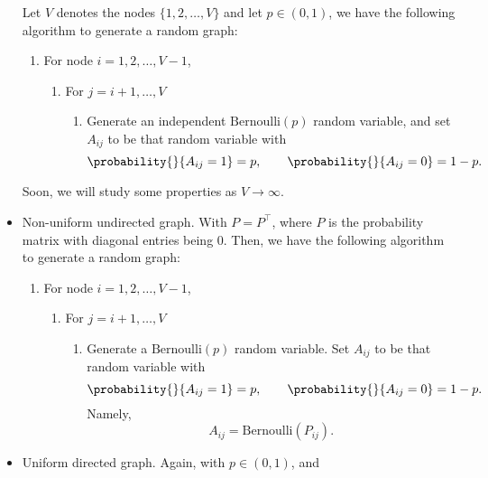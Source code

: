 \begin{itemize}
	      Let \(V\) denotes the nodes \(\{1, 2, \ldots , V\}\) and let \(p\in(0, 1)\), we have the following algorithm to generate a random graph:
	      \begin{enumerate}
		      \item For node \(i = 1, 2, \ldots , V - 1\),
		            \begin{enumerate}
			            \item For \(j = i+1, \ldots , V\)
			                  \begin{enumerate}
				                  \item Generate an independent \(\mathrm{Bernoulli}(p)\) random variable, and set \(A_{ij}\) to be that random variable with
				                        \[
					                        \probability{}{A_{ij} = 1} = p, \qquad \probability{}{A_{ij} = 0} = 1-p  .
				                        \]
			                  \end{enumerate}
		            \end{enumerate}
	      \end{enumerate}
	      Soon, we will study some properties as \(V\to \infty\).
	\item Non-uniform undirected graph. With \(P = P^{\top}\), where \(P\) is the probability matrix with diagonal entries being \(0\). Then, we have the following algorithm to
	      generate a random graph:
	      \begin{enumerate}
		      \item For node \(i = 1, 2, \ldots , V - 1\),
		            \begin{enumerate}
			            \item For \(j = i+1, \ldots , V\)
			                  \begin{enumerate}
				                  \item Generate a \(\mathrm{Bernoulli}(p)\) random variable. Set \(A_{ij}\) to be that random variable with
				                        \[
					                        \probability{}{A_{ij} = 1} = p, \qquad \probability{}{A_{ij} = 0} = 1-p  .
				                        \]
				                        Namely,
				                        \[
					                        A_{ij} = \mathrm{Bernoulli}(P_{ij}).
				                        \]
			                  \end{enumerate}
		            \end{enumerate}
	      \end{enumerate}
	\item Uniform directed graph. Again, with \(p\in(0, 1)\), and

\end{itemize}

